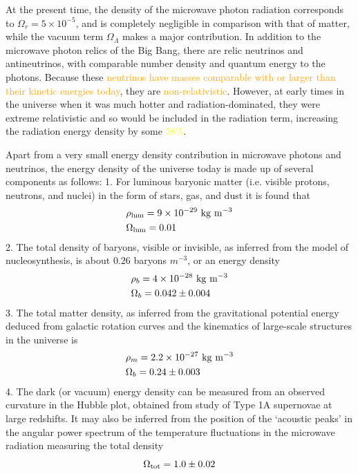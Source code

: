 \documentclass[12pt,a4paper]{article}
\begin{document}
At the present time, the density of the microwave photon radiation corresponds to $\Omega_r = 5 \times 10^{-5}$, and is completely negligible in comparison with that of matter, while the vacuum term $\Omega_\Lambda$ makes a major contribution. In addition to the microwave photon relics of the Big Bang, there are relic neutrinos and antineutrinos, with comparable number density and quantum energy to the photons. Because these \textcolor{orange}{neutrinos have masses comparable with or larger than their kinetic energies today}, they are \textcolor{orange}{non-relativistic}. However, at early times in the universe when it was much hotter and radiation-dominated, they were extreme relativistic and so would be included in the radiation term, increasing the radiation energy density by some \textcolor{yellow}{$58 \%$}.

Apart from a very small energy density contribution in microwave photons and neutrinos, the energy density of the universe today is made up of several components as follows:
1. For luminous baryonic matter (i.e. visible protons, neutrons, and nuclei) in the form of stars, gas, and dust it is found that
\begin{align}
& \rho_{\rm lum} = 9 \times 10^{-29} ~{\rm kg ~m^{-3}} \\
& \Omega_{\rm lum} = 0.01
\end{align}
2. The total density of baryons, visible or invisible, as inferred from the model of nucleosynthesis, is about $0.26$ baryons $m^{-3}$, or an energy density
\begin{align}
& \rho_{b} = 4 \times 10^{-28} ~{\rm kg ~m^{-3}} \\
& \Omega_{b} = 0.042 \pm 0.004
\end{align}
3. The total matter density, as inferred from the gravitational potential energy deduced from galactic rotation curves  and the kinematics of large-scale structures in the universe is
\begin{align}
& \rho_{m} = 2.2 \times 10^{-27} ~{\rm kg ~m^{-3}} \\
& \Omega_{b} = 0.24 \pm 0.003
\end{align}
4. The dark (or vacuum) energy density can be measured from an observed curvature in the Hubble plot, obtained from study of Type 1A supernovae at large redshifts. It may also be inferred from the position of the `acoustic peaks' in the angular power spectrum of the temperature fluctuations in the microwave radiation measuring the total density
\begin{equation}
\Omega_{\rm tot} = 1.0 \pm 0.02
\end{equation}
\end{document}
